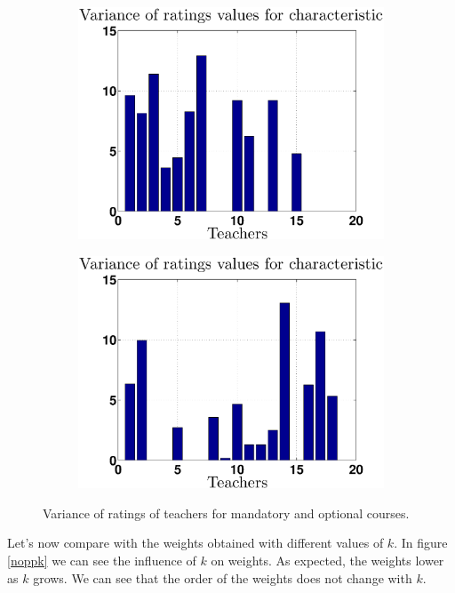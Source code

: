 \documentclass[12pt,a4paper]{article}
\begin{document}
\begin{figure}[h!]
\centering
\begin{subfigure}[b]{0.49\textwidth}
    \centering
    \includegraphics[width = \textwidth]{noPreprocess/varTeachersC1.eps}
\end{subfigure}
\begin{subfigure}[b]{0.49\textwidth}
    \centering
    \includegraphics[width = \textwidth]{noPreprocess/varTeachersC2.eps}
\end{subfigure}
\caption{Variance of ratings of teachers for mandatory and optional courses\label{var1}.}
\end{figure}


Let's now compare with the weights obtained with different values of $k$. In figure \ref{noppk} we can see the influence of $k$ on weights. As expected, the weights lower as $k$ grows. We can see that the order of the weights does not change with $k$.
\end{document}
